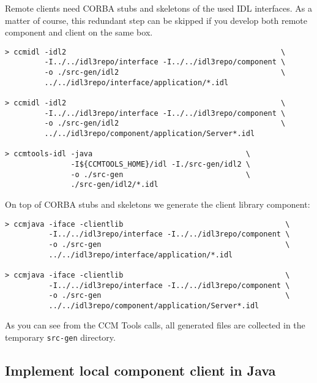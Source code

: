 \vspace{3mm}
Remote clients need CORBA stubs and skeletons of the used IDL interfaces.
As a matter of course, this redundant step can be skipped if you develop both
remote component and client on the same box.
\begin{footnotesize}
\begin{verbatim}
> ccmidl -idl2                                                 \
         -I../../idl3repo/interface -I../../idl3repo/component \ 
         -o ./src-gen/idl2                                     \
         ../../idl3repo/interface/application/*.idl

> ccmidl -idl2                                                 \ 
         -I../../idl3repo/interface -I../../idl3repo/component \
         -o ./src-gen/idl2                                     \
         ../../idl3repo/component/application/Server*.idl

> ccmtools-idl -java                                   \
               -I${CCMTOOLS_HOME}/idl -I./src-gen/idl2 \ 
               -o ./src-gen                            \
               ./src-gen/idl2/*.idl
\end{verbatim}
\end{footnotesize}

On top of CORBA stubs and skeletons we generate the client library component:
\begin{footnotesize}
\begin{verbatim}
> ccmjava -iface -clientlib                                     \
          -I../../idl3repo/interface -I../../idl3repo/component \
          -o ./src-gen                                          \
          ../../idl3repo/interface/application/*.idl

> ccmjava -iface -clientlib                                     \
          -I../../idl3repo/interface -I../../idl3repo/component \
          -o ./src-gen                                          \
          ../../idl3repo/component/application/Server*.idl
\end{verbatim}
\end{footnotesize}

As you can see from the CCM Tools calls, all generated files are collected in
the temporary {\tt src-gen} directory.



\subsection{Implement local component client in Java}
\label{subsection:ImplementRemoteComponentClientInJava}

